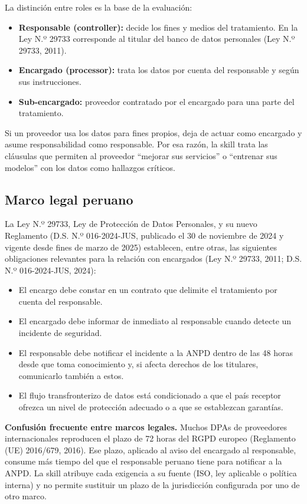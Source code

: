 \documentclass[12pt,letterpaper]{article}
\begin{document}
La distinción entre roles es la base de la evaluación:

\begin{itemize}
  \item \textbf{Responsable (controller):} decide los fines y medios del tratamiento. En la Ley N.º 29733 corresponde al titular del banco de datos personales (Ley N.º 29733, 2011).
  \item \textbf{Encargado (processor):} trata los datos por cuenta del responsable y según sus instrucciones.
  \item \textbf{Sub-encargado:} proveedor contratado por el encargado para una parte del tratamiento.
\end{itemize}

Si un proveedor usa los datos para fines propios, deja de actuar como encargado y asume responsabilidad como responsable. Por esa razón, la skill trata las cláusulas que permiten al proveedor ``mejorar sus servicios'' o ``entrenar sus modelos'' con los datos como hallazgos críticos.

\subsection{Marco legal peruano}

La Ley N.º 29733, Ley de Protección de Datos Personales, y su nuevo Reglamento (D.S. N.º 016-2024-JUS, publicado el 30 de noviembre de 2024 y vigente desde fines de marzo de 2025) establecen, entre otras, las siguientes obligaciones relevantes para la relación con encargados (Ley N.º 29733, 2011; D.S. N.º 016-2024-JUS, 2024):

\begin{itemize}
  \item El encargo debe constar en un contrato que delimite el tratamiento por cuenta del responsable.
  \item El encargado debe informar de inmediato al responsable cuando detecte un incidente de seguridad.
  \item El responsable debe notificar el incidente a la ANPD dentro de las 48 horas desde que toma conocimiento y, si afecta derechos de los titulares, comunicarlo también a estos.
  \item El flujo transfronterizo de datos está condicionado a que el país receptor ofrezca un nivel de protección adecuado o a que se establezcan garantías.
\end{itemize}

\par\noindent \textbf{Confusión frecuente entre marcos legales.} Muchos DPAs de proveedores internacionales reproducen el plazo de 72 horas del RGPD europeo (Reglamento (UE) 2016/679, 2016). Ese plazo, aplicado al aviso del encargado al responsable, consume más tiempo del que el responsable peruano tiene para notificar a la ANPD. La skill atribuye cada exigencia a su fuente (ISO, ley aplicable o política interna) y no permite sustituir un plazo de la jurisdicción configurada por uno de otro marco.
\par
\end{document}
